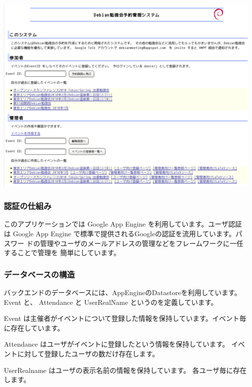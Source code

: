 \documentclass[mingoth,a4paper]{jsarticle}
\begin{document}
\includegraphics[width=0.5\hsize]{image201002/debianmeeting-screenshot.png}

\subsubsection{認証の仕組み}

このアプリケーションでは Google App Engine を利用しています。ユーザ認証は
Google App Engine で標準で提供されるGoogleの認証を流用しています。パスワー
ドの管理やユーザのメールアドレスの管理などをフレームワークに一任することで管理を
簡単にしています。


\subsubsection{データベースの構造}

バックエンドのデータベースには、AppEngineのDatastoreを利用しています。
Event と、 Attendance と UserRealName というのを定義しています。

Event は主催者がイベントについて登録した情報を保持しています。イベント毎
に存在しています。

Attendance はユーザがイベントに登録したという情報を保持しています。
イベントに対して登録したユーザの数だけ存在します。

UserRealname はユーザの表示名前の情報を保持しています。
各ユーザ毎に存在します。
\end{document}
